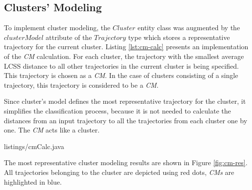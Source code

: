 \subsection{Clusters' Modeling}

To implement cluster modeling, the $Cluster$ entity class was augmented by the $clusterModel$ attribute of the $Trajectory$ type which stores a representative trajectory for the current cluster. Listing \ref{lst:cm-calc} presents an implementation of the \textit{CM} calculation. For each cluster, the trajectory with the smallest average LCSS distance to all other trajectories in the current cluster is being specified. This trajectory is chosen as a \textit{CM}. In the case of clusters consisting of a single trajectory, this trajectory is considered to be a \textit{CM}.

Since cluster's model defines the most representative trajectory for the cluster, it simplifies the classification process, because it is not needed to calculate the distances from an input trajectory to all the trajectories from each cluster one by one. The \textit{CM} acts like a cluster.

 {listings/cmCalc.java}

The most representative cluster modeling results are shown in Figure \ref{fig:cm-res}. All trajectories belonging to the cluster are depicted using red dots, \textit{CMs} are highlighted in blue.

